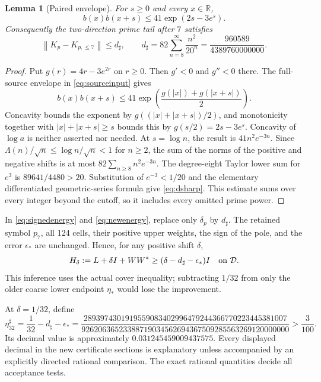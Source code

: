 \documentclass[11pt,a4paper]{article}
\numberwithin{equation}{section}
\newtheorem{lemma}[theorem]{Lemma}
\theoremstyle{definition}\newtheorem{definition}[theorem]{Definition}
\theoremstyle{remark}\newtheorem{remark}[theorem]{Remark}
\newcommand{\DD}{\mathcal D}
\newcommand{\R}{\mathbb R}
\newcommand{\norm}[1]{\left\|#1\right\|}
\begin{document}
\begin{lemma}[Paired envelope]\label{lem:paired}
For $s\ge0$ and every $x\in\R$,
\begin{equation}\label{eq:paired}
 b(x)b(x+s)\le41\exp(2s-3e^s).
\end{equation}
Consequently the two-direction prime tail after $7$ satisfies
\begin{equation}\label{eq:dsharp}
 \norm{K_p-K_{p,\le7}}\le d_\sharp,
 \qquad d_\sharp=82\sum_{n=8}^{\infty}\frac{n^2}{20^n}
 =\frac{960589}{4389760000000}.
\end{equation}
\end{lemma}
\begin{proof}
Put $g(r)=4r-3e^{2r}$ on $r\ge0$. Then $g'<0$ and $g''<0$ there. The full-source envelope in \eqref{eq:sourceinput} gives
\[
 b(x)b(x+s)\le41\exp\!\left(\frac{g(|x|)+g(|x+s|)}2\right).
\]
Concavity bounds the exponent by $g((|x|+|x+s|)/2)$, and monotonicity together with $|x|+|x+s|\ge s$ bounds this by $g(s/2)=2s-3e^s$. Concavity of $\log a$ is neither asserted nor needed. At $s=\log n$, the result is $41n^2e^{-3n}$. Since $\Lambda(n)/\sqrt n\le\log n/\sqrt n<1$ for $n\ge2$, the sum of the norms of the positive and negative shifts is at most $82\sum_{n\ge8}n^2e^{-3n}$. The degree-eight Taylor lower sum for $e^3$ is $89641/4480>20$. Substitution of $e^{-3}<1/20$ and the elementary differentiated geometric-series formula give \eqref{eq:dsharp}. This estimate sums over every integer beyond the cutoff, so it includes every omitted prime power.
\end{proof}

In \eqref{eq:signedenergy} and \eqref{eq:newenergy}, replace only $\delta_p$ by $d_\sharp$. The retained symbol $p_7$, all 124 cells, their positive upper weights, the sign of the pole, and the error $\epsilon_*$ are unchanged. Hence, for any positive shift $\delta$,
\begin{equation}\label{eq:genericsharp}
 H_\delta:=L+\delta I+WW^*\ge
 (\delta-d_\sharp-\epsilon_*)I
 \quad\hbox{on }\DD.
\end{equation}
This inference uses the actual cover inequality; subtracting $1/32$ from only the older coarse lower endpoint $\eta_*$ would lose the improvement.

At $\delta=1/32$, define
\begin{equation}\label{eq:eta32}
 \eta_{32}^{\sharp}=\frac1{32}-d_\sharp-\epsilon_*
 =\frac{2893974301919559083402996479244366770223445381007}
 {92620636523388719034562694367509285563269120000000}
 >\frac3{100}.
\end{equation}
Its decimal value is approximately $0.031245459009437575$. Every displayed decimal in the new certificate sections is explanatory unless accompanied by an explicitly directed rational comparison. The exact rational quantities decide all acceptance tests.
\end{document}
